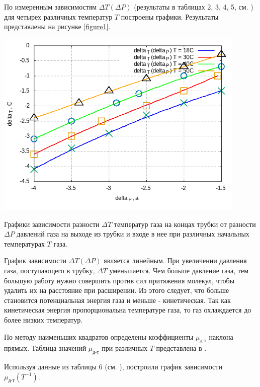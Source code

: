 По измеренным зависимостям $\Delta T(\Delta P)$ (результаты в таблицах 2, 3, 4, 5, см. ) для четырех различных температур $T$ построены графики. Результаты представлены на рисунке \ref{figure1}.
\begin{center}
    \label{figure1}
    \includegraphics[width=0.9\textwidth]{img/graph6 (2).png}

    
    Графики зависимости разности $\Delta T$ температур газа на концах трубки от разности $\Delta P$ давлений газа на выходе из трубки и входе в нее при различных начальных температурах $T$ газа.
\end{center}



График зависимости $\Delta T(\Delta P)$ является линейным. При увеличении давления газа, поступающего в трубку, $\Delta T$ уменьшается. Чем больше давление газа, тем большую работу нужно совершить против сил притяжения молекул, чтобы удалить их на расстояние при расширении. Из этого следует, что больше становится потенциальная энергия газа и меньше - кинетическая. Так как кинетическая энергия пропорциональна температуре газа, то газ охлаждается до более низких температур.

По методу наименьших квадратов определены коэффициенты $\mu_\text{д-т}$ наклона прямых. Таблица значений $\mu_\text{д-т}$ при различных $T$ представлена в .

Используя данные из таблицы 6 (см. ), построили график зависимости $\mu_{\text{д-т}}(T^{-1})$. 

